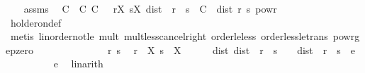 \begin{isabellebody}
\ \ \isamarkupfalse%
\ assms\ \isamarkupfalse%
\ C\ \ C{\isacharcolon}{\kern0pt}\ {\isachardoublequoteopen}C\ {\isasymge}\ {}{\isachardoublequoteclose}\ {\isachardoublequoteopen}{\isacharparenleft}{\kern0pt}{\isasymforall}r{\isasymin}X{\isachardot}{\kern0pt}\ {\isasymforall}s{\isasymin}X{\isachardot}{\kern0pt}\ dist\ {\isacharparenleft}{\kern0pt}{\isasymphi}\ r{\isacharparenright}{\kern0pt}\ {\isacharparenleft}{\kern0pt}{\isasymphi}\ s{\isacharparenright}{\kern0pt}\ {\isasymle}\ C\ {\isacharasterisk}{\kern0pt}\ dist\ r\ s\ powr\ {\isasymgamma}{\isacharparenright}{\kern0pt}{\isachardoublequoteclose}\isanewline
\ \ \ \ \isamarkupfalse%
\ holder{\isacharunderscore}{\kern0pt}on{\isacharunderscore}{\kern0pt}def\isanewline
\ \ \ \ \isamarkupfalse%
\ {\isacharparenleft}{\kern0pt}metis\ linorder{\isacharunderscore}{\kern0pt}not{\isacharunderscore}{\kern0pt}le\ mult{\isacharunderscore}{\kern0pt}{}\ mult{\isacharunderscore}{\kern0pt}less{\isacharunderscore}{\kern0pt}cancel{\isacharunderscore}{\kern0pt}right{}\ order{\isacharunderscore}{\kern0pt}le{\isacharunderscore}{\kern0pt}less\ order{\isacharunderscore}{\kern0pt}less{\isacharunderscore}{\kern0pt}le{\isacharunderscore}{\kern0pt}trans\ powr{\isacharunderscore}{\kern0pt}ge{\isacharunderscore}{\kern0pt}pzero{\isacharparenright}{\kern0pt}\ \ \ \ \ \ \isanewline
\ \ \isacommand{{\isacharbraceleft}{\kern0pt}}\isamarkupfalse%
\isanewline
\ \ \ \ \isamarkupfalse%
\ r\ s\ \isamarkupfalse%
\ {\isachardoublequoteopen}r\ {\isasymin}\ X{\isachardoublequoteclose}\ {\isachardoublequoteopen}s\ {\isasymin}\ X{\isachardoublequoteclose}\isanewline
\ \ \ \ \isamarkupfalse%
\ dist{\isacharunderscore}{\kern0pt}{}{\isacharcolon}{\kern0pt}\ {\isachardoublequoteopen}dist\ {\isacharparenleft}{\kern0pt}{\isasymphi}\ r{\isacharparenright}{\kern0pt}\ {\isacharparenleft}{\kern0pt}{\isasymphi}\ s{\isacharparenright}{\kern0pt}\ {\isacharequal}{\kern0pt}\ {}\ {\isasymLongrightarrow}\ dist\ {\isacharparenleft}{\kern0pt}{\isasymphi}\ r{\isacharparenright}{\kern0pt}\ {\isacharparenleft}{\kern0pt}{\isasymphi}\ s{\isacharparenright}{\kern0pt}\ {\isacharless}{\kern0pt}\ e{\isachardoublequoteclose}\isanewline
\ \ \ \ \ \ \isamarkupfalse%
\ {\isacartoucheopen}{}\ {\isacharless}{\kern0pt}\ e{\isacartoucheclose}\ \isamarkupfalse%
\ linarith\isanewline
\ \ \ \ \isamarkupfalse%
\ \isamarkupfalse%

\end{isabellebody}
